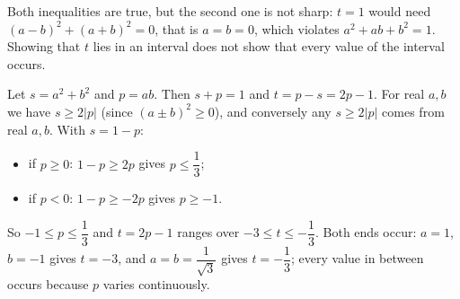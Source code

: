 Both inequalities are true, but the second one is not sharp: $t=1$ would need $(a-b)^2+(a+b)^2=0$, that is $a=b=0$, which violates $a^2+ab+b^2=1$. Showing that $t$ lies in an interval does not show that every value of the interval occurs.

Let $s=a^2+b^2$ and $p=ab$. Then $s+p=1$ and $t=p-s=2p-1$. For real $a,b$ we have $s\ge 2|p|$ (since $(a\pm b)^2\ge0$), and conversely any $s\ge2|p|$ comes from real $a,b$. With $s=1-p$:
\begin{itemize}
\item if $p\ge0$: $1-p\ge2p$ gives $p\le\dfrac{1}{3}$;
\item if $p<0$: $1-p\ge-2p$ gives $p\ge-1$.
\end{itemize}
So $-1\le p\le\dfrac{1}{3}$ and $t=2p-1$ ranges over $\boxed{-3\le t\le-\dfrac{1}{3}}$. Both ends occur: $a=1$, $b=-1$ gives $t=-3$, and $a=b=\dfrac{1}{\sqrt3}$ gives $t=-\dfrac{1}{3}$; every value in between occurs because $p$ varies continuously.
